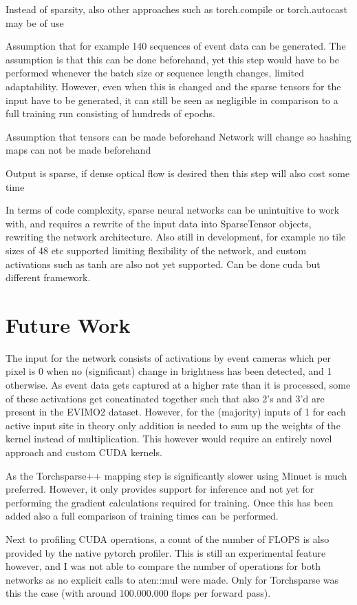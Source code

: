 \documentclass{article}
\begin{document}
Instead of sparsity, also other approaches such as torch.compile or torch.autocast may be of use 

Assumption that for example 140 sequences of event data can be generated. The assumption is that this can be done beforehand, yet this step would have to be performed whenever the batch size or sequence length changes, limited adaptability. However, even when this is changed and the sparse tensors for the input have to be generated, it can still be seen as negligible in comparison to a full training run consisting of hundreds of epochs. 

Assumption that tensors can be made beforehand
Network will change so hashing maps can not be made beforehand

Output is sparse, if dense optical flow is desired then this step will also cost some time

In terms of code complexity, sparse neural networks can be unintuitive to work with, and requires a rewrite of the input data into SparseTensor objects, rewriting the network architecture. Also still in development, for example no tile sizes of 48 etc supported limiting flexibility of the network, and custom activations such as tanh are also not yet supported. Can be done cuda but different framework. 

\section{Future Work}
The input for the network consists of activations by event cameras which per pixel is 0 when no (significant) change in brightness has been detected, and 1 otherwise. As event data gets captured at a higher rate than it is processed, some of these activations get concatinated together such that also 2's and 3'd are present in the EVIMO2 dataset. However, for the (majority) inputs of 1 for each active input site in theory only addition is needed to sum up the weights of the kernel instead of multiplication. This however would require an entirely novel approach and custom CUDA kernels. 

As the Torchsparse++ mapping step is significantly slower using Minuet is much preferred. However, it only provides support for inference and not yet for performing the gradient calculations required for training. Once this has been added also a full comparison of training times can be performed. 

Next to profiling CUDA operations, a count of the number of FLOPS is also provided by the native pytorch profiler. This is still an experimental feature however, and I was not able to compare the number of operations for both networks as no explicit calls to aten::mul were made. Only for Torchsparse was this the case (with around 100.000.000 flops per forward pass). 
\end{document}
